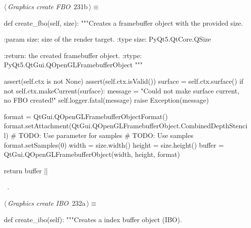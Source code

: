 \documentclass[%
    a4paper,    %
    justified,  %
    nobib,      %
    openany     %
]{tufte-book}
\makeatletter
\renewcommand{\label}[1]{\@tufte@label{##1}}%
\makeatother
\begin{document}
\begin{fullwidth}
\begin{flushleft}
\begin{minipage}{\linewidth}
\begin{list}{}{\setlength{\itemsep}{-\parsep}\setlength{\itemindent}{-\leftmargin}}
\item{}
\end{list}
\end{minipage}\vspace{4ex}
\end{flushleft}
\begin{flushleft} \small
\begin{minipage}{\linewidth}\label{scrap243}\raggedright\small
{} $\langle\,${\itshape Graphics create FBO}\nobreak\ {\footnotesize {231b}}$\,\rangle\equiv$
\vspace{-1ex}
\begin{pythoncode}
def create_fbo(self, size):
    """Creates a framebuffer object with the provided size.

    :param size: size of the render target.
    :type  size: PyQt5.QtCore.QSize

    :return: the created framebuffer object.
    :rtype:  PyQt5.QtGui.QOpenGLFramebufferObject
    """

    assert(self.ctx is not None)
    assert(self.ctx.isValid())
    surface = self.ctx.surface()
    if not self.ctx.makeCurrent(surface):
        message = "Could not make surface current, no FBO created!"
        self.logger.fatal(message)
        raise Exception(message)

    format = QtGui.QOpenGLFramebufferObjectFormat()
    format.setAttachment(QtGui.QOpenGLFramebufferObject.CombinedDepthStencil)
    # TODO: Use parameter for samples
    # TODO: Use samples
    format.setSamples(0)
    width = size.width()
    height = size.height()
    buffer = QtGui.QOpenGLFramebufferObject(width, height, format)

    return buffer
|\NWsep|
\end{pythoncode}
\vspace{1.5ex}
\footnotesize
\begin{list}{}{\setlength{\itemsep}{-\parsep}\setlength{\itemindent}{-\leftmargin}}
\item \NWtxtMacroRefIn\ .

\item{}
\end{list}
\end{minipage}\vspace{4ex}
\end{flushleft}
\begin{flushleft} \small
\begin{minipage}{\linewidth}\label{scrap244}\raggedright\small
{} $\langle\,${\itshape Graphics create IBO}\nobreak\ {\footnotesize {232a}}$\,\rangle\equiv$
\vspace{-1ex}
\begin{pythoncode}
def create_ibo(self):
    """Creates a index buffer object (IBO).


\end{pythoncode}
\end{minipage}
\end{flushleft}
\end{fullwidth}
\end{document}
